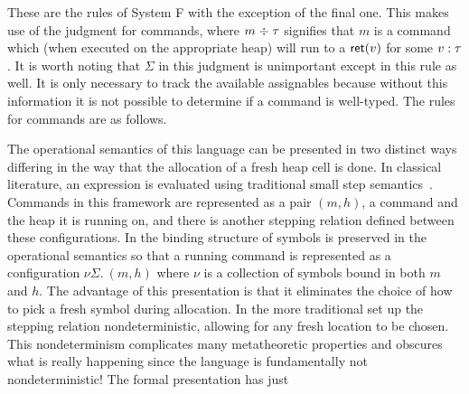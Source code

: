 These are the rules of System F with the exception of the final
one. This makes use of the judgment for commands, where
$m \mathrel{\div} \tau$ signifies that $m$ is a command which (when executed
on the appropriate heap) will run to a $\mathsf{ret}(v)$ for some
$v \mathrel{:} \tau$. It is worth noting that $\Sigma$ in this judgment is
unimportant except in this rule as well. It is only necessary to track
the available assignables because without this information it is not
possible to determine if a command is well-typed. The rules for
commands are as follows.
The operational semantics of this language can be presented in two
distinct ways differing in the way that the allocation of a fresh heap
cell is done. In classical literature, an expression is evaluated
using traditional small step
semantics~\citep{TODO-SMALL-STEP}. Commands in this framework are
represented as a pair $(m, h)$, a command and the heap it is running
on, and there is another stepping relation defined between these
configurations. In \citet{TODO-PFPL} the binding structure of symbols
is preserved in the operational semantics so that a running command is
represented as a configuration $\nu \Sigma.\ (m, h)$ where $\nu$ is a
collection of symbols bound in both $m$ and $h$. The advantage of this
presentation is that it eliminates the choice of how to pick a fresh
symbol during allocation. In the more traditional set up the stepping
relation nondeterministic, allowing for any fresh location to be
chosen. This nondeterminism complicates many metatheoretic properties
and obscures what is really happening since the language is
fundamentally not nondeterministic! The formal presentation has just
